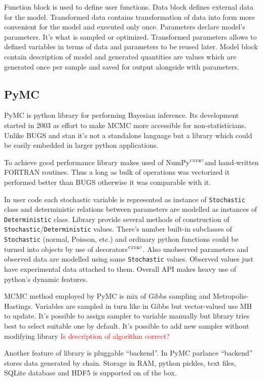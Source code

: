 \documentclass[a4paper]{article}
\newcommand{\FIXME}[1]{\textcolor{red}{#1}}
\newcommand{\citationneeded}{\textcolor{red}{$^{\mbox{\tiny{CITE?}}}$}}
\begin{document}
Function block is used to define user functions. Data block defines external
data for the model. Transformed data contains transformation of data into form
more convenient for the model and executed only once. Parameters declare model's
parameters. It's what is sampled or optimized. Transformed parameters allows to
defined variables in terms of data and parameters to be reused later. Model
block contain description of model and generated quantities are values which are
generated once per sample and saved for output alongside with parameters.

\subsection{PyMC}

PyMC\cite{patil2010pymc} is python library for performing Bayesian
inference. Its development started in 2003 as effort to make MCMC more
accessible for non-statisticians. Unlike BUGS and stan it's not a standalone
language but a library which could be easily embedded in larger python
applications.

To achieve good performance library makes used of NumPy\citationneeded and
hand-written FORTRAN routines. Thus a long as bulk of operations was vectorized
it performed better than BUGS otherwise it was comparable with it.

In user code each stochastic variable is represented as instance of
\texttt{Stochastic} class and deterministic relations between parameters are
modelled as instances of \texttt{Deterministic} class. Library provide several
methods of construction of \texttt{Stochastic}/\texttt{Deterministic}
values. There's number built-in subclasses of \texttt{Stochastic} (normal,
Poisson, etc.) and ordinary python functions could be turned into objects by use
of decorators\citationneeded. Also unobserved parameters and observed data are
modelled using same \texttt{Stochastic} values. Observed values just have
experimental data attached to them. Overall API makes heavy use of python's
dynamic features.


MCMC method employed by PyMC is mix of Gibbs sampling and
Metropolis-Hastings. Variables are sampled in turn like in Gibbs but
vector-valued use MH to update. It's possible to assign sampler to variable
manually but library tries best to select suitable one by default. It's possible
to add new sampler without modifying library \FIXME{Is description of algorithm
  correct?}

Another feature of library is pluggable ``backend''. In PyMC parlance
``backend'' stores data generated by chain. Storage in RAM, python pickles, text
files, SQLite database and HDF5 is supported on of the box.
\end{document}

